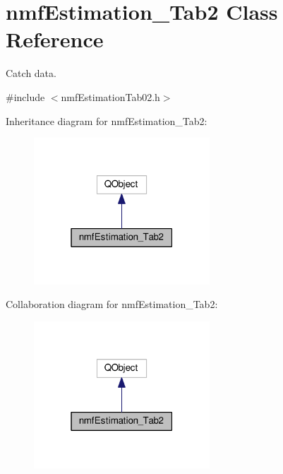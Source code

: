 \hypertarget{classnmf_estimation___tab2}{}\section{nmf\+Estimation\+\_\+\+Tab2 Class Reference}
\label{classnmf_estimation___tab2}


Catch data.  




{\ttfamily \#include $<$nmf\+Estimation\+Tab02.\+h$>$}



Inheritance diagram for nmf\+Estimation\+\_\+\+Tab2\+:\nopagebreak
\begin{figure}[H]
\begin{center}
\leavevmode
\includegraphics[width=187pt]{classnmf_estimation___tab2__inherit__graph}
\end{center}
\end{figure}


Collaboration diagram for nmf\+Estimation\+\_\+\+Tab2\+:\nopagebreak
\begin{figure}[H]
\begin{center}
\leavevmode
\includegraphics[width=187pt]{classnmf_estimation___tab2__coll__graph}
\end{center}
\end{figure}

